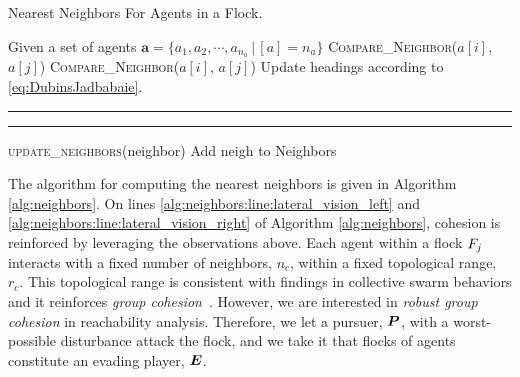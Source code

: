 \begin{algorithm}[tb!]
\caption{Nearest Neighbors For Agents in a Flock.
		\label{alg:neighbors}}
\begin{algorithmic}[1]
	\State Given a set of agents $\bm{a} = \{a_1, a_2, \cdots, a_{n_a} \,| \,[a] = n_a\}$ 
		\label{alg:neighbors:line:lateral_vision_left}
			\State \textsc{Compare\_Neighbor($a[i]$, $a[j]$)}
		\EndFor
		\label{alg:neighbors:line:lateral_vision_right}
		\State \textsc{Compare\_Neighbor($a[i]$, $a[j]$)}
		\EndFor
	\EndFor
	 \State Update headings according to \eqref{eq:DubinsJadbabaie}.
	\EndFor 
\EndFunction
\end{algorithmic}
%
\hrule
%
\begin{algorithmic}[1]
	\EndIf
	\EndFunction
\end{algorithmic}
%
\hrule
%
\begin{algorithmic}[1]
	\State {}
			\State \textsc{\textsf{update\_neighbors}}(\textup{neighbor})
		\EndFor 
	\EndIf
	\State Add \textup{\textsf{neigh}} to \textsf{Neighbors}
	\EndFunction
	\EndProcedure
\end{algorithmic}
\end{algorithm}
%

The algorithm for computing the nearest neighbors is given in Algorithm \autoref{alg:neighbors}. On lines \autoref{alg:neighbors:line:lateral_vision_left} and \autoref{alg:neighbors:line:lateral_vision_right} of Algorithm \autoref{alg:neighbors}, cohesion is reinforced by leveraging the observations above. 
Each agent within a flock $F_j$ interacts with a fixed number of neighbors, $n_c$, within a fixed topological range, $r_c$. This topological range %
is consistent with findings in collective swarm behaviors and it reinforces \textit{group cohesion}~\cite{Ballerini1232}. However, we are interested in \textit{robust group cohesion} in reachability analysis. Therefore, we let a pursuer, $\bm{P}$, with a worst-possible disturbance attack the flock, and we take it that flocks of agents constitute an evading player, $\bm{E}$. 

